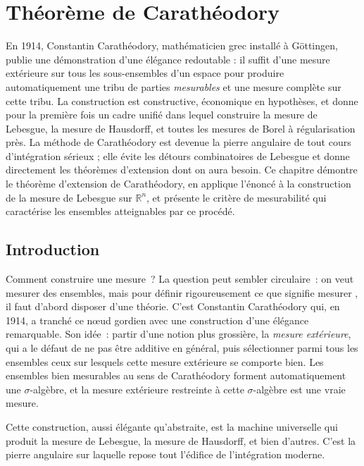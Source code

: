 \chapter{Th\'eor\`eme de Carath\'eodory}
\label{ch:caratheodory}

En 1914, Constantin Carathéodory, mathématicien grec installé à Göttingen, publie une démonstration d'une élégance redoutable : il suffit d'une mesure extérieure sur tous les sous-ensembles d'un espace pour produire automatiquement une tribu de parties \emph{mesurables} et une mesure complète sur cette tribu. La construction est constructive, économique en hypothèses, et donne pour la première fois un cadre unifié dans lequel construire la mesure de Lebesgue, la mesure de Hausdorff, et toutes les mesures de Borel à régularisation près. La méthode de Carathéodory est devenue la pierre angulaire de tout cours d'intégration sérieux ; elle évite les détours combinatoires de Lebesgue et donne directement les théorèmes d'extension dont on aura besoin. Ce chapitre démontre le théorème d'extension de Carathéodory, en applique l'énoncé à la construction de la mesure de Lebesgue sur $\mathbb{R}^n$, et présente le critère de mesurabilité qui caractérise les ensembles atteignables par ce procédé.

\section{Introduction}

Comment construire une mesure~? La question peut sembler circulaire~: on veut mesurer des ensembles, mais pour d\'efinir rigoureusement ce que signifie \og mesurer \fg, il faut d'abord disposer d'une th\'eorie. C'est Constantin Carath\'eodory qui, en 1914, a tranch\'e ce n\oe ud gordien avec une construction d'une \'el\'egance remarquable. Son id\'ee~: partir d'une notion plus grossi\`ere, la \emph{mesure ext\'erieure}, qui a le d\'efaut de ne pas \^etre additive en g\'en\'eral, puis s\'electionner parmi tous les ensembles ceux sur lesquels cette mesure ext\'erieure se comporte bien. Les ensembles \og bien mesurables \fg au sens de Carath\'eodory forment automatiquement une $\sigma$-alg\`ebre, et la mesure ext\'erieure restreinte \`a cette $\sigma$-alg\`ebre est une vraie mesure.

Cette construction, aussi \'el\'egante qu'abstraite, est la machine universelle qui produit la mesure de Lebesgue, la mesure de Hausdorff, et bien d'autres. C'est la pierre angulaire sur laquelle repose tout l'\'edifice de l'int\'egration moderne.

